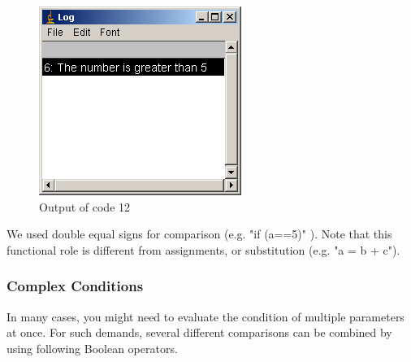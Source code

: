 \documentclass[11pt,a4paper,oneside]{report}
\begin{document}
\begin{figure}[htbp]
\begin{center}
\includegraphics[scale=0.6]{fig/fig2341_code12out.png}
\caption{Output of code 12}
\label{fig:code12 output}
\end{center}
\end{figure} 



We used double equal signs for comparison (e.g. "if (a==5)" ). Note that this functional role is different from assignments, or substitution (e.g. "a = b + c").

\subsubsection{Complex Conditions}
In many cases, you might need to evaluate the condition of multiple parameters at once. For such demands, several different comparisons can be combined by using following Boolean operators. 
\end{document}
